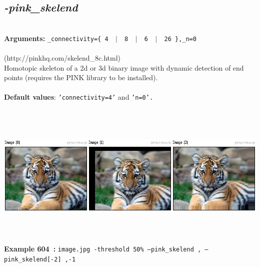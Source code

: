 \documentclass[a4paper,11pt,twoside]{book}
\begin{document}
\subsection{\emph{-pink\_skelend} }\vspace*{-0.5em}
~\\\textbf{Arguments: } 
{\small \texttt{\_connectivity=\{ 4 ~$|$~ 8 ~$|$~ 6 ~$|$~ 26 \},\_n=0}}\\~\\
(http://pinkhq.com/skelend\_8c.html)
~\\Homotopic skeleton of a 2d or 3d binary image with dynamic detection of end points (requires the PINK library to be installed).
~\\~\\\textbf{Default values}: {\small \texttt{'connectivity=4'} and \texttt{'n=0'.}}
\begin{center}\includegraphics[keepaspectratio=true,height=7cm,width=\textwidth]{img/gmic_def604.jpg}\\
{\footnotesize \textbf{Example 604~:} \texttt{image.jpg -threshold 50\% --pink\_skelend , --pink\_skelend[-2] ,-1}}
\end{center}
\end{document}
